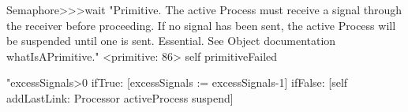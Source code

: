 \documentclass[a4paper,10pt,twoside]{book}
\begin{document}
\begin{code}{}
Semaphore>>>wait
	"Primitive. The active Process must receive a signal through the receiver 
	before proceeding. If no signal has been sent, the active Process will be 
	suspended until one is sent. Essential. See Object documentation 
	whatIsAPrimitive."
		<primitive: 86>
	self primitiveFailed

	"excessSignals>0  
		ifTrue: [excessSignals := excessSignals-1]  
		ifFalse: [self addLastLink: Processor activeProcess suspend]
\end{code}
% 
% 
% 
% 
% 
% 
\end{document}
